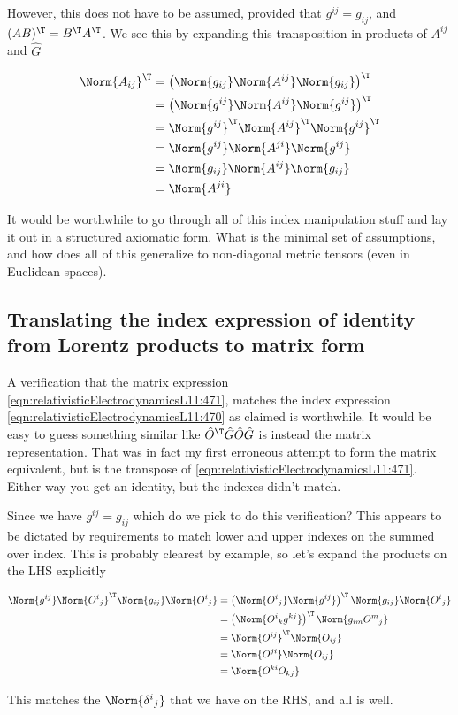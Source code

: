 However, this does not have to be assumed, provided that $g^{ij} = g_{ij}$, and $(AB)^\T = B^\T A^\T$.  We see this by expanding this transposition in products of $A^{ij}$ and $\hat{G}$

\begin{align*}
\Norm{ A_{ij} }^\T
&= \left( \Norm{g_{ij}} \Norm{ A^{ij} } \Norm{g_{ij}} \right)^\T \\
&= \left( \Norm{g^{ij}} \Norm{ A^{ij} } \Norm{g^{ij}} \right)^\T \\
&= \Norm{g^{ij}}^\T \Norm{ A^{ij}}^\T \Norm{g^{ij}}^\T \\
&= \Norm{g^{ij}} \Norm{ A^{ji}} \Norm{g^{ij}} \\
&= \Norm{g_{ij}} \Norm{ A^{ij}} \Norm{g_{ij}} \\
&= \Norm{ A^{ji}} 
\end{align*}

It would be worthwhile to go through all of this index manipulation stuff and lay it out in a structured axiomatic form.  What is the minimal set of assumptions, and how does all of this generalize to non-diagonal metric tensors (even in Euclidean spaces).

\subsection{Translating the index expression of identity from Lorentz products to matrix form}

A verification that the matrix expression \ref{eqn:relativisticElectrodynamicsL11:471}, matches the index expression \ref{eqn:relativisticElectrodynamicsL11:470} as claimed is worthwhile.  It would be easy to guess something similar like $\hat{O}^\T \hat{G} \hat{O} \hat{G}$ is instead the matrix representation.  That was in fact my first erroneous attempt to form the matrix equivalent, but is the transpose of \ref{eqn:relativisticElectrodynamicsL11:471}.  Either way you get an identity, but the indexes didn't match.

Since we have $g^{ij} = g_{ij}$ which do we pick to do this verification?  This appears to be dictated by requirements to match lower and upper indexes on the summed over index.  This is probably clearest by example, so let's expand the products on the LHS explicitly

\begin{align*}
\Norm{ g^{ij} } 
\Norm{ {O^{i}}_j } ^\T
\Norm{ g_{ij} }
\Norm{ {O^{i}}_j } 
&=
\left( \Norm{ {O^{i}}_j } 
\Norm{ g^{ij} } \right) ^\T
\Norm{ g_{ij} }
\Norm{ {O^{i}}_j }  \\
&=
\left( \Norm{ {O^{i}}_k g^{kj} } \right) ^\T
\Norm{ g_{im} {O^{m}}_j }  \\
&=
\Norm{ O^{ij} } ^\T
\Norm{ O_{ij} }  \\
&=
\Norm{ O^{ji} } 
\Norm{ O_{ij} }  \\
&=
\Norm{ O^{ki} O_{kj} }  \\
\end{align*}

This matches the $\Norm{{\delta^i}_j}$ that we have on the RHS, and all is well.

\EndArticle
